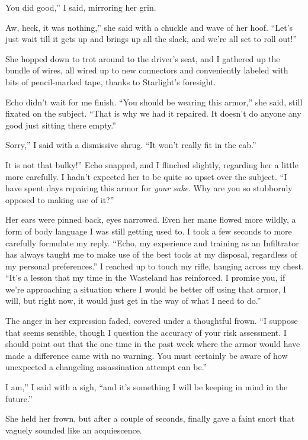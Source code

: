 \leavevmode{}You did good,” I said, mirroring her grin.

\leavevmode{}Aw, heck, it was nothing,” she said with a chuckle and wave of her hoof. “Let’s just wait till it gets up and brings up all the slack, and we’re all set to roll out!”

She hopped down to trot around to the driver’s seat, and I gathered up the bundle of wires, all wired up to new connectors and conveniently labeled with bits of pencil-marked tape, thanks to Starlight’s foresight.

Echo didn’t wait for me finish. “You should be wearing this armor,” she said, still fixated on the subject. “That is why we had it repaired. It doesn’t do anyone any good just sitting there empty.”

\leavevmode{}Sorry,” I said with a dismissive shrug. “It won’t really fit in the cab.”

\leavevmode{}It is not that bulky!” Echo snapped, and I flinched slightly, regarding her a little more carefully. I hadn’t expected her to be quite so upset over the subject. “I have spent days repairing this armor for \textit{your sake}. Why are you so stubbornly opposed to making use of it?”

Her ears were pinned back, eyes narrowed. Even her mane flowed more wildly, a form of body language I was still getting used to. I took a few seconds to more carefully formulate my reply. “Echo, my experience and training as an Infiltrator has always taught me to make use of the best tools at my disposal, regardless of my personal preferences.” I reached up to touch my rifle, hanging across my chest. “It’s a lesson that my time in the Wasteland has reinforced. I promise you, if we’re approaching a situation where I would be better off using that armor, I will, but right now, it would just get in the way of what I need to do.”

The anger in her expression faded, covered under a thoughtful frown. “I suppose that seems sensible, though I question the accuracy of your risk assessment. I should point out that the one time in the past week where the armor would have made a difference came with no warning. You must certainly be aware of how unexpected a changeling assassination attempt can be.”

\leavevmode{}I am,” I said with a sigh, “and it’s something I will be keeping in mind in the future.”

She held her frown, but after a couple of seconds, finally gave a faint snort that vaguely sounded like an acquiescence.

